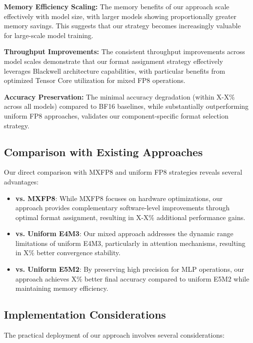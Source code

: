 \documentclass[conference]{IEEEtran}
\begin{document}
\textbf{Memory Efficiency Scaling:} The memory benefits of our approach scale effectively with model size, with larger models showing proportionally greater memory savings. This suggests that our strategy becomes increasingly valuable for large-scale model training.

\textbf{Throughput Improvements:} The consistent throughput improvements across model scales demonstrate that our format assignment strategy effectively leverages Blackwell architecture capabilities, with particular benefits from optimized Tensor Core utilization for mixed FP8 operations.

\textbf{Accuracy Preservation:} The minimal accuracy degradation (within X-X\% across all models) compared to BF16 baselines, while substantially outperforming uniform FP8 approaches, validates our component-specific format selection strategy.

\subsection{Comparison with Existing Approaches}

Our direct comparison with MXFP8 and uniform FP8 strategies reveals several advantages:

\begin{itemize}
\item \textbf{vs. MXFP8}: While MXFP8 focuses on hardware optimizations, our approach provides complementary software-level improvements through optimal format assignment, resulting in X-X\% additional performance gains.

\item \textbf{vs. Uniform E4M3}: Our mixed approach addresses the dynamic range limitations of uniform E4M3, particularly in attention mechanisms, resulting in X\% better convergence stability.

\item \textbf{vs. Uniform E5M2}: By preserving high precision for MLP operations, our approach achieves X\% better final accuracy compared to uniform E5M2 while maintaining memory efficiency.
\end{itemize}

\subsection{Implementation Considerations}

The practical deployment of our approach involves several considerations:
\end{document}
